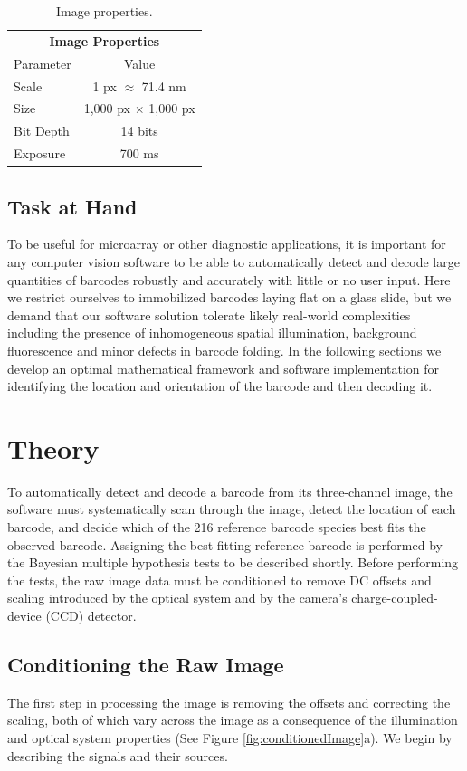 \begin{table}[htbp] 
\begin{center}
\begin{tabular}{l c}
\multicolumn{2}{c}{\textbf{Image Properties}}\\
Parameter & Value \\
\hline
Scale & 1 px $\approx$ 71.4 nm \\
Size & 1,000 px $\times$ 1,000 px \\
Bit Depth & 14 bits\\
Exposure & 700 ms\\
\hline
\end{tabular}
\end{center}
\caption{Image properties. \label{table:image}	}
\end{table}
 
\subsection{Task at Hand}
To be useful for microarray or other diagnostic applications, it is important for any computer vision software to be able to automatically detect and decode large quantities of barcodes robustly and accurately with little or no user input. 
Here we restrict ourselves to immobilized barcodes laying flat on a glass slide, but we demand that our software solution tolerate likely real-world complexities including the presence of inhomogeneous spatial illumination, background fluorescence and minor defects in barcode folding.  
In the following sections we develop an optimal mathematical framework and software implementation for identifying the location and orientation of the barcode and then decoding it.


\section{Theory}
To automatically detect and decode a barcode from its three-channel image, the software must systematically scan through the image, detect the location of each barcode, and decide which of the 216 reference barcode species best fits the observed barcode. Assigning the best fitting reference barcode is performed by the Bayesian multiple hypothesis tests to be described shortly. Before performing the tests, the raw image data must be conditioned to remove DC offsets and scaling introduced by the optical system and by the camera's charge-coupled-device (CCD) detector.


\subsection{Conditioning the Raw Image}
The first step in processing the image is removing the offsets and correcting the scaling, both of which vary across the image as a consequence of the illumination and optical system properties (See Figure \ref{fig:conditionedImage}a). We begin by describing the signals and their sources.

